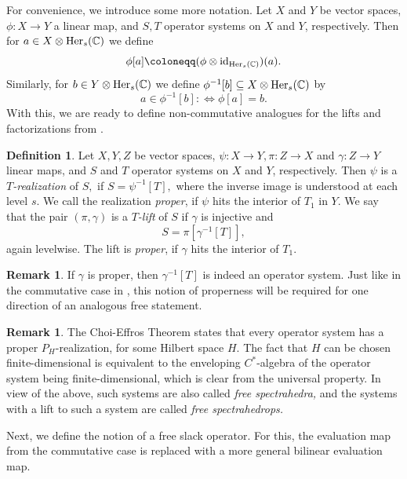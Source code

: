 \documentclass[11pt,onecolumn]{article}
\theoremstyle{plain}
\theoremstyle{definition}
\newtheorem{definition}[theorem]{Definition}
\newtheorem{remark}[theorem]{Remark}
\newcommand{\C}{\mathbb{C}}
\begin{document}
For convenience, we introduce some more notation. Let \(X\) and \(Y\) be vector spaces, \(\phi\colon X \to Y\) a linear map, and \(S, T\) operator systems on \(X\) and \(Y\), respectively. Then for \(a \in X\otimes{\rm Her}_s(\C)\) we define $$\phi[a] \coloneqq (\phi \otimes {\rm id}_{{\rm Her}_s(\mathbb C)})(a).$$ Similarly, for \(b \in Y\otimes{\rm Her}_s(\C)\) we define \(\phi^{-1}[b]\subseteq X\otimes{\rm Her}_s(\C)\) by \[a \in \phi^{-1}[b] :\Leftrightarrow \phi[a] = b.\]
With this, we are ready to define non-commutative analogues for the lifts and factorizations from .

\begin{definition}
	Let \(X, Y, Z\) be vector spaces, $\psi\colon X\to Y, \pi\colon Z \to X$ and $\gamma\colon Z \to Y$ linear maps, and \(S\) and \(T\) operator systems on \(X\) and \(Y\), respectively.
    Then $\psi$ is a {\it $T$-realization} of $S,$ if $S=\psi^{-1}[T],$ where the inverse image is understood at each level $s$. We call the realization {\it proper}, if $\psi$ hits the interior of $T_1$ in $Y$.
    We say that the pair \((\pi, \gamma)\) is a {\it $T$-lift} of \(S\) if $\gamma$ is injective and \[S = \pi[\gamma^{-1}[T]],\] again levelwise.
    The lift is \textit{proper}, if $\gamma$ hits the interior of $T_1.$
\end{definition}

\begin{remark} \label{rem:lift}
    If $\gamma$ is proper, then \(\gamma^{-1}[T]\) is indeed an operator system. Just like in the commutative case in , this notion of properness will be required for one direction of an analogous free statement.
\end{remark}

\begin{remark}
    The Choi-Effros Theorem states that every operator system has a proper $P_H$-realization, for some Hilbert space $H$. The fact that $H$ can be chosen finite-dimensional is equivalent to the enveloping $C^*$-algebra of the operator system being finite-dimensional, which is clear from the universal property. In view of the above, such systems are also called {\it free spectrahedra,} and the systems with a lift to such a system are called {\it free spectrahedrops.}
\end{remark}

Next, we define the notion of a free slack operator. For this, the evaluation map from the commutative case is replaced with a more general bilinear evaluation map.
\end{document}
